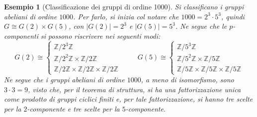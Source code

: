 \documentclass[12pt]{scrartcl}
\theoremstyle{style}
\newtheorem{esempio}{Esempio}[section]
\numberwithin{equation}{subsection}
\begin{document}
\begin{esempio}
	[Classificazione dei gruppi di ordine 1000]
Si classificano i gruppi abeliani di ordine $1000$.
Per farlo, si inizia col notare che $1000 = 2^3 \cdot 5^3$, quindi $G \cong G(2) \times G(5)$, con $\lvert G(2) \rvert = 2^3$ e $\lvert G(5) \rvert =5^3$.
Ne segue che le $p$-componenti si possono riscrivere nei seguenti modi:
\[
G(2) \cong \begin{cases}
	\mathbb{Z}/2^3\mathbb{Z}\\
	\mathbb{Z}/2^2 \mathbb{Z} \times \mathbb{Z}/2\mathbb{Z}\\
	\mathbb{Z}/2\mathbb{Z} \times \mathbb{Z}/2\mathbb{Z} \times \mathbb{Z}/2\mathbb{Z}
\end{cases}\hspace{1cm}G(5) \cong \begin{cases}
	\mathbb{Z}/5^3\mathbb{Z}\\
	\mathbb{Z}/5^2 \mathbb{Z} \times \mathbb{Z}/5\mathbb{Z}\\
	\mathbb{Z}/5\mathbb{Z} \times \mathbb{Z}/5\mathbb{Z} \times \mathbb{Z}/5\mathbb{Z}
\end{cases}
\] 
Ne segue che i gruppi abeliani di ordine $1000$, a meno di isomorfismo, sono $3\cdot 3 = 9$, visto che, per il teorema di struttura, si ha una fattorizzazione unica come prodotto di gruppi ciclici finiti e, per tale fattorizzazione, si hanno tre scelte per la $2$-componente e tre scelte per la $5$-componente.
\end{esempio}
\end{document}
